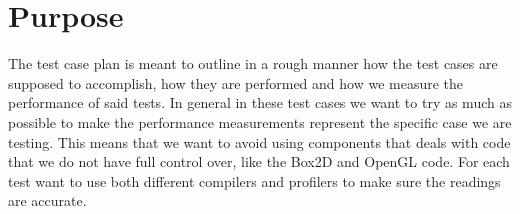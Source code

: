 \section{Purpose}

\noindent The test case plan is meant to outline in a rough manner how the test cases are supposed to accomplish, how they are performed and how we measure the performance of said tests.
In general in these test cases we want to try as much as possible to make the performance measurements represent the specific case we are testing.
This means that we want to avoid using components that deals with code that we do not have full control over, like the Box2D and OpenGL code.
For each test want to use both different compilers and profilers to make sure the readings are accurate. 